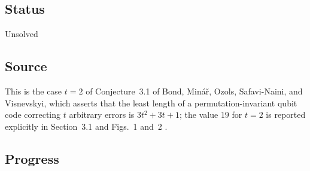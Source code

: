 \subsection*{Status}

Unsolved

\subsection*{Source}

This is the case $t=2$ of Conjecture~3.1 of Bond, Min\'a\v{r}, Ozols,
Safavi-Naini, and Visnevskyi, which asserts that the least length of a
permutation-invariant qubit code correcting $t$ arbitrary errors is
$3t^2+3t+1$; the value $19$ for $t=2$ is reported explicitly in Section~3.1 and
Figs.~1 and~2 .

\subsection*{Progress}

